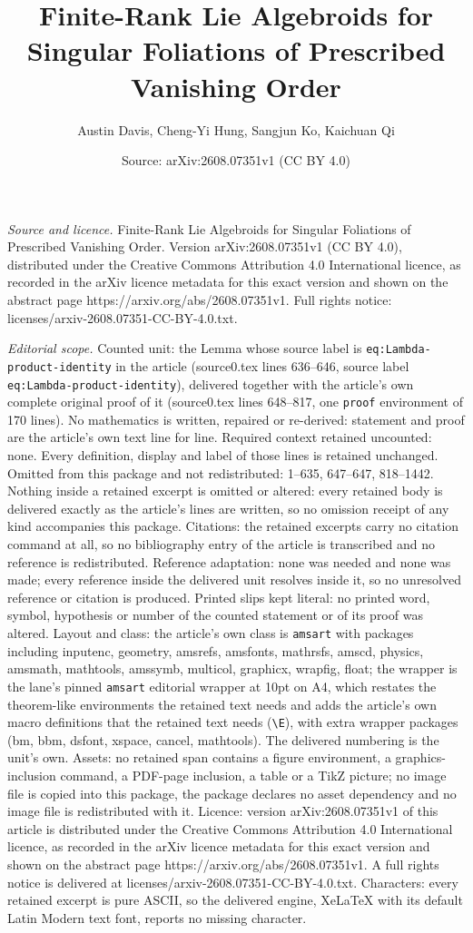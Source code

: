 \documentclass[10pt,a4paper]{amsart}
\title[Finite-Rank Lie Algebroids for Singular Foliations of Prescr]{Finite-Rank Lie Algebroids for Singular Foliations of Prescribed Vanishing Order}
\author{Austin Davis, Cheng-Yi Hung, Sangjun Ko, Kaichuan Qi}
\date{Source: arXiv:2608.07351v1 (CC BY 4.0)}
\begin{document}
\maketitle

\noindent\emph{Source and licence.} Finite-Rank Lie Algebroids for Singular Foliations of Prescribed Vanishing Order. Version arXiv:2608.07351v1 (CC BY 4.0), distributed under the Creative Commons Attribution 4.0 International licence, as recorded in the arXiv licence metadata for this exact version and shown on the abstract page https://arxiv.org/abs/2608.07351v1. Full rights notice: licenses/arxiv-2608.07351-CC-BY-4.0.txt.\par\smallskip

\noindent\textit{Editorial scope.} Counted unit: the Lemma whose source label is \texttt{eq:Lambda-product-identity} in the article (source0.tex lines 636--646, source label \texttt{eq:Lambda-product-identity}), delivered together with the article's own complete original proof of it (source0.tex lines 648--817, one \texttt{proof} environment of 170 lines). No mathematics is written, repaired or re-derived: statement and proof are the article's own text line for line. Required context retained uncounted: none. Every definition, display and label of those lines is retained unchanged. Omitted from this package and not redistributed: 1--635, 647--647, 818--1442. Nothing inside a retained excerpt is omitted or altered: every retained body is delivered exactly as the article's lines are written, so no omission receipt of any kind accompanies this package. Citations: the retained excerpts carry no citation command at all, so no bibliography entry of the article is transcribed and no reference is redistributed. Reference adaptation: none was needed and none was made; every reference inside the delivered unit resolves inside it, so no unresolved reference or citation is produced. Printed slips kept literal: no printed word, symbol, hypothesis or number of the counted statement or of its proof was altered. Layout and class: the article's own class is \texttt{amsart} with packages including inputenc, geometry, amsrefs, amsfonts, mathrsfs, amscd, physics, amsmath, mathtools, amssymb, multicol, graphicx, wrapfig, float; the wrapper is the lane's pinned \texttt{amsart} editorial wrapper at 10pt on A4, which restates the theorem-like environments the retained text needs and adds the article's own macro definitions that the retained text needs (\texttt{\textbackslash E}), with extra wrapper packages (bm, bbm, dsfont, xspace, cancel, mathtools). The delivered numbering is the unit's own. Assets: no retained span contains a figure environment, a graphics-inclusion command, a PDF-page inclusion, a table or a TikZ picture; no image file is copied into this package, the package declares no asset dependency and no image file is redistributed with it. Licence: version arXiv:2608.07351v1 of this article is distributed under the Creative Commons Attribution 4.0 International licence, as recorded in the arXiv licence metadata for this exact version and shown on the abstract page https://arxiv.org/abs/2608.07351v1. A full rights notice is delivered at licenses/arxiv-2608.07351-CC-BY-4.0.txt. Characters: every retained excerpt is pure ASCII, so the delivered engine, XeLaTeX with its default Latin Modern text font, reports no missing character.
\end{document}
